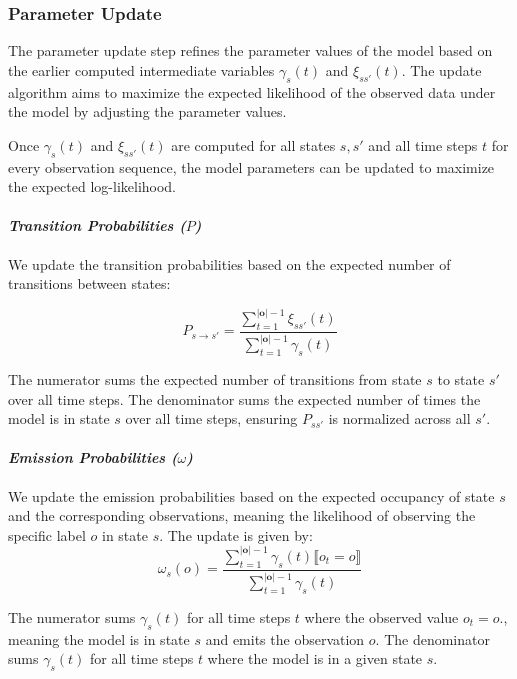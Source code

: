 \subsubsection{Parameter Update}
The parameter update step refines the parameter values of the model based on the earlier computed intermediate variables $\gamma_s(t)$ and $\xi_{ss'}(t)$.
The update algorithm aims to maximize the expected likelihood of the observed data under the model by adjusting the parameter values.

Once $\gamma_s(t)$ and $\xi_{ss'}(t)$ are computed for all states $s, s'$ and all time steps $t$ for every observation sequence, the model parameters can be updated to maximize the expected log-likelihood.

\paragraph*{\textit{Transition Probabilities ($P$)}}

We update the transition probabilities based on the expected number of transitions between states:


\begin{equation}
    P_{s \rightarrow s'} = \frac{\sum_{t = 1}^{|\mathbf{o}|-1} \xi_{ss'}(t)}{\sum_{t = 1}^{|\mathbf{o}|-1} \gamma_s(t)}
    \label{eq:transition-probabilities}
\end{equation}


The numerator sums the expected number of transitions from state $s$ to state $s'$ over all time steps.
The denominator sums the expected number of times the model is in state $s$ over all time steps, ensuring $P_{ss'}$ is normalized across all $s'$.

\paragraph*{\textit{Emission Probabilities ($\omega$)}}

We update the emission probabilities based on the expected occupancy of state $s$ and the corresponding observations, meaning the likelihood of observing the specific label $o$ in state $s$. 
The update is given by:
\begin{equation}
    \omega_s(o) = \frac{\sum_{t = 1}^{|\mathbf{o}|-1} \gamma_s(t) \lBrack o_t = o \rBrack}{\sum_{t = 1}^{|\mathbf{o}|-1} \gamma_s(t)}
    \label{eq:omega}
\end{equation}

The numerator sums $\gamma_s(t)$ for all time steps $t$ where the observed value $o_t = o$., meaning the model is in state $s$ and emits the observation $o$.
The denominator sums $\gamma_s(t)$ for all time steps $t$ where the model is in a given state $s$.


